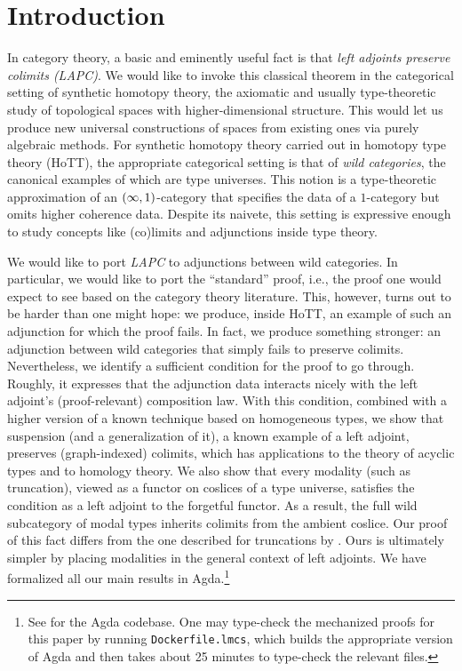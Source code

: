 \section{Introduction}\label{sec:intro} 

In category theory, a basic and eminently useful fact is that \emph{left adjoints preserve colimits (LAPC)}. We would like to invoke this classical theorem in the categorical setting of synthetic homotopy theory, the axiomatic and usually type-theoretic study of topological spaces with higher-dimensional structure. This would let us produce new universal constructions of spaces from existing ones via purely algebraic methods. For synthetic homotopy theory carried out in homotopy type theory (HoTT), the appropriate categorical setting is that of \emph{wild categories}, the canonical examples of which are type universes. This notion is a type-theoretic approximation of an $\mleft(\infty,1\mright)$-category that specifies the data of a $1$-category but omits higher coherence data. Despite its naivete, this setting is expressive enough to study concepts like (co)limits and adjunctions inside type theory. 

We would like to port \emph{LAPC} to adjunctions between wild categories. In particular, we would like to port the ``standard'' proof, i.e., the proof one would expect to see based on the category theory literature. This, however, turns out to be harder than one might hope: we produce, inside HoTT, an example of such an adjunction for which the proof fails. In fact, we produce something stronger: an adjunction between wild categories that simply fails to preserve colimits. Nevertheless, we identify a sufficient condition for the proof to go through. Roughly, it expresses that the adjunction data interacts nicely with the left adjoint's (proof-relevant) composition law. With this condition, combined with a higher version of a known technique based on homogeneous types, we show that suspension (and a generalization of it), a known example of a left adjoint, preserves (graph-indexed) colimits, which has applications to the theory of acyclic types and to homology theory. We also show that every modality (such as truncation), viewed as a functor on coslices of a type universe, satisfies the condition as a left adjoint to the forgetful functor. As a result, the full wild subcategory of modal types inherits colimits from the ambient coslice. Our proof of this fact differs from the one described for truncations by \cite[Section 7.4]{Uni13}. Ours is ultimately simpler by placing modalities in the general context of left adjoints. We have formalized all our main results in Agda.\footnote{See \cite{2cohagda-pub} for the Agda codebase. One may type-check the mechanized proofs for this paper by running \texttt{Dockerfile.lmcs}, which builds the appropriate version of Agda and then takes about 25 minutes to type-check the relevant files.} 

